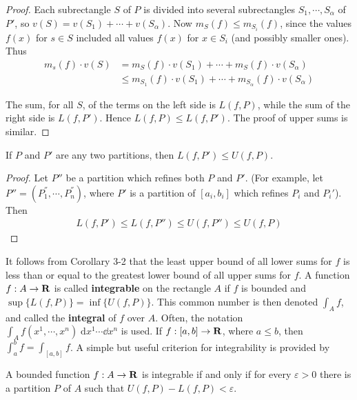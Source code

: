 \begin{proof}
    Each subrectangle $S$ of $P$ is divided into several subrectangles $S_1, \cdots, S_\alpha$ of 
    $P'$, so $v(S) = v(S_1) + \cdots +v(S_\alpha)$. Now $m_S(f)\le m_{S_i}(f)$, since the values 
    $f(x)$ for $s\in S$ included all values $f(x)$ for $x\in S_i$ (and possibly smaller ones).
    Thus 
    \begin{align*}
        m_s(f)\cdot v(S) 
        & = m_S(f)\cdot v(S_1) + \cdots + m_S(f)\cdot v(S_\alpha)\\
        & \le m_{S_1}(f)\cdot v(S_1) + \cdots + m_{S_\alpha}(f)\cdot v(S_\alpha)
    \end{align*}

    The sum, for all $S$, of the terms on the left side is $L(f, P)$, while 
    the sum of the right side is $L(f, P')$. Hence $L(f, P)\le L(f, P')$. The 
    proof of upper sums is similar. 
\end{proof}


\begin{corollary}
    If $P$ and $P'$ are any two partitions, then $L(f,P') \le U(f,P)$.
    \label{corollary3-2}
\end{corollary}

\begin{proof}
    Let $P''$ be a partition which refines both $P$ and $P'$.
    (For example, let $P'' = (P_1^{''}, \cdots, P_n^{''})$, where $P'$ is a 
    partition of $[a_i, b_i]$ which refines $P_i$ and $P_i'$). Then 
    \begin{align*}
        L(f, P') \le L(f, P'') \le U(f, P'') \le U(f, P)
    \end{align*}
\end{proof}

It follows from Corollary 3-2 that the least upper bound of
all lower sums for $f$ is less than or equal to the greatest lower
bound of all upper sums for $f$. A function $f:A \to \mathbf{R}$ is called \textbf{integrable} 
on the rectangle $A$ if $f$ is bounded and $\sup\{L(f,P)\} = \inf \{U(f, P)\}$. 
This common number is then denoted $\int_{A }^{}{f}$, and called the \textbf{integral} of 
$f$ over $A$. Often, the notation $\int_{A  }^{}{f(x^1, \cdots, x^n)  \;\mathrm{d}x^1\cdots \dd x^n}$ 
is used. If $f:[a, b]\to \mathbf{R}$, where $a\le b$, then $\int_{a  }^{b }{f} = \int_{[a, b ]}^{}{f}$.
A simple but useful criterion for integrability is provided by 
\begin{theorem}
    A bounded function $f:A\to \mathbf{R}$ is integrable if and only if for every $\varepsilon>0$ 
    there is a partition $P$ of $A$ such that $U(f, P) - L(f, P)< \varepsilon$.
\end{theorem}

